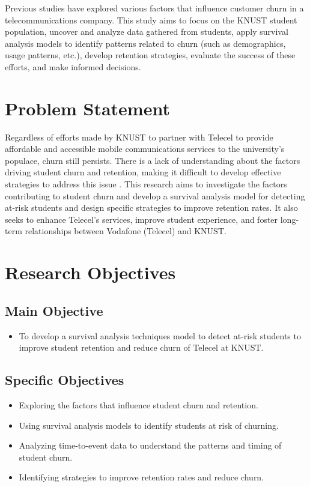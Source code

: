 \documentclass[12pt]{report}
\begin{document}
	Previous studies have explored various factors that influence customer churn in a telecommunications company. This study aims to focus on the KNUST student population, uncover and analyze data gathered from students, apply survival analysis models to identify patterns related to churn (such as demographics, usage patterns, etc.), develop retention strategies, evaluate the success of these efforts, and make informed decisions.
	
	\section{Problem Statement}
	
	Regardless of efforts made by KNUST to partner with Telecel to provide affordable and accessible mobile communications services to the university’s populace, churn still persists. There is a lack of understanding about the factors driving student churn and retention, making it difficult to develop effective strategies to address this issue \cite{kapur2018}. This research aims to investigate the factors contributing to student churn and develop a survival analysis model for detecting at-risk students and design specific strategies to improve retention rates. It also seeks to enhance Telecel’s services, improve student experience, and foster long-term relationships between Vodafone (Telecel) and KNUST.
	
	\section{Research Objectives}
	
	\subsection{Main Objective}
	\begin{itemize}
		\item To develop a survival analysis techniques model to detect at-risk students to improve student retention and reduce churn of Telecel at KNUST.
	\end{itemize}
	
	\subsection{Specific Objectives}
	\begin{itemize}
		\item Exploring the factors that influence student churn and retention.
		\item Using survival analysis models to identify students at risk of churning.
		\item Analyzing time-to-event data to understand the patterns and timing of student churn.
		\item Identifying strategies to improve retention rates and reduce churn.
	\end{itemize}
	
\end{document}
